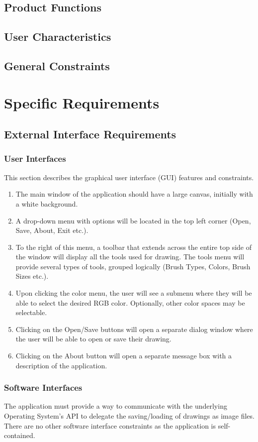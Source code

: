 \documentclass{article}
\begin{document}
\subsection{Product Functions}
\subsection{User Characteristics}
\subsection{General Constraints}

\section{Specific Requirements}
\subsection{External Interface Requirements}
\subsubsection{User Interfaces}
This section describes the graphical user interface (GUI) features and constraints.
\begin{enumerate}
\item The main window of the application should have a large canvas, initially with a white background.
\item A drop-down menu with options will be located in the top left corner (Open, Save, About, Exit etc.).
\item To the right of this menu, a toolbar that extends across the entire top side of the window will display all the tools used for drawing. The tools menu will provide several types of tools, grouped logically (Brush Types, Colors, Brush Sizes etc.).
\item Upon clicking the color menu, the user will see a submenu where they will be able to select the desired RGB color. Optionally, other color spaces may be selectable.
\item Clicking on the Open/Save buttons will open a separate dialog window where the user will be able to open or save their drawing.
\item Clicking on the About button will open a separate message box with a description of the application.
\end{enumerate}

\subsubsection{Software Interfaces}
The application must provide a way to communicate with the underlying Operating System's API to delegate the saving/loading of drawings as image files. There are no other software interface constraints as the application is self-contained.
\end{document}
